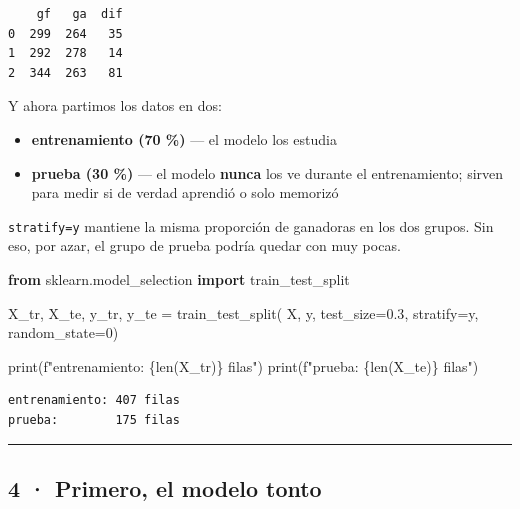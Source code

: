 \documentclass[
]{article}
\newenvironment{Shaded}{}{}
\newcommand{\BuiltInTok}[1]{\textcolor[rgb]{0.00,0.50,0.00}{#1}}
\newcommand{\DecValTok}[1]{\textcolor[rgb]{0.25,0.63,0.44}{#1}}
\newcommand{\FloatTok}[1]{\textcolor[rgb]{0.25,0.63,0.44}{#1}}
\newcommand{\ImportTok}[1]{\textcolor[rgb]{0.00,0.50,0.00}{\textbf{#1}}}
\newcommand{\NormalTok}[1]{#1}
\newcommand{\OperatorTok}[1]{\textcolor[rgb]{0.40,0.40,0.40}{#1}}
\newcommand{\SpecialCharTok}[1]{\textcolor[rgb]{0.25,0.44,0.63}{#1}}
\newcommand{\SpecialStringTok}[1]{\textcolor[rgb]{0.73,0.40,0.53}{#1}}
\providecommand{\tightlist}{%
  \setlength{\itemsep}{0pt}\setlength{\parskip}{0pt}}
\begin{document}
\begin{verbatim}
    gf   ga  dif
0  299  264   35
1  292  278   14
2  344  263   81
\end{verbatim}

\protect{}\label{5f27ae0f}
Y ahora partimos los datos en dos:

\begin{itemize}
\tightlist
\item
  \textbf{entrenamiento (70 \%)} --- el modelo los estudia
\item
  \textbf{prueba (30 \%)} --- el modelo \textbf{nunca} los ve durante el
  entrenamiento; sirven para medir si de verdad aprendió o solo memorizó
\end{itemize}

\texttt{stratify=y} mantiene la misma proporción de ganadoras en los dos
grupos. Sin eso, por azar, el grupo de prueba podría quedar con muy
pocas.

\protect{}\label{679f4a20}
\begin{Shaded}
\begin{Highlighting}[]
\ImportTok{from}\NormalTok{ sklearn.model\_selection }\ImportTok{import}\NormalTok{ train\_test\_split}

\NormalTok{X\_tr, X\_te, y\_tr, y\_te }\OperatorTok{=}\NormalTok{ train\_test\_split(}
\NormalTok{    X, y, test\_size}\OperatorTok{=}\FloatTok{0.3}\NormalTok{, stratify}\OperatorTok{=}\NormalTok{y, random\_state}\OperatorTok{=}\DecValTok{0}\NormalTok{)}

\BuiltInTok{print}\NormalTok{(}\SpecialStringTok{f"entrenamiento: }\SpecialCharTok{\{}\BuiltInTok{len}\NormalTok{(X\_tr)}\SpecialCharTok{\}}\SpecialStringTok{ filas"}\NormalTok{)}
\BuiltInTok{print}\NormalTok{(}\SpecialStringTok{f"prueba:        }\SpecialCharTok{\{}\BuiltInTok{len}\NormalTok{(X\_te)}\SpecialCharTok{\}}\SpecialStringTok{ filas"}\NormalTok{)}
\end{Highlighting}
\end{Shaded}

\begin{verbatim}
entrenamiento: 407 filas
prueba:        175 filas
\end{verbatim}

\protect{}\label{e256d7e9}
\begin{center}\rule{0.5\linewidth}{0.5pt}\end{center}

\subsection{4 · Primero, el modelo
tonto}\label{4--primero-el-modelo-tonto}
\end{document}
